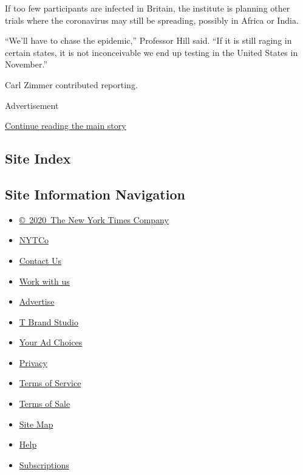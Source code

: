 If too few participants are infected in Britain, the institute is
planning other trials where the coronavirus may still be spreading,
possibly in Africa or India.

``We'll have to chase the epidemic,'' Professor Hill said. ``If it is
still raging in certain states, it is not inconceivable we end up
testing in the United States in November.''

Carl Zimmer contributed reporting.

Advertisement

\protect\hyperlink{after-bottom}{Continue reading the main story}

\hypertarget{site-index}{%
\subsection{Site Index}\label{site-index}}

\hypertarget{site-information-navigation}{%
\subsection{Site Information
Navigation}\label{site-information-navigation}}

\begin{itemize}
\tightlist
\item
  \href{https://help.nytimes.com/hc/en-us/articles/115014792127-Copyright-notice}{©~2020~The
  New York Times Company}
\end{itemize}

\begin{itemize}
\tightlist
\item
  \href{https://www.nytco.com/}{NYTCo}
\item
  \href{https://help.nytimes.com/hc/en-us/articles/115015385887-Contact-Us}{Contact
  Us}
\item
  \href{https://www.nytco.com/careers/}{Work with us}
\item
  \href{https://nytmediakit.com/}{Advertise}
\item
  \href{http://www.tbrandstudio.com/}{T Brand Studio}
\item
  \href{https://www.nytimes.com/privacy/cookie-policy\#how-do-i-manage-trackers}{Your
  Ad Choices}
\item
  \href{https://www.nytimes.com/privacy}{Privacy}
\item
  \href{https://help.nytimes.com/hc/en-us/articles/115014893428-Terms-of-service}{Terms
  of Service}
\item
  \href{https://help.nytimes.com/hc/en-us/articles/115014893968-Terms-of-sale}{Terms
  of Sale}
\item
  \href{https://spiderbites.nytimes.com}{Site Map}
\item
  \href{https://help.nytimes.com/hc/en-us}{Help}
\item
  \href{https://www.nytimes.com/subscription?campaignId=37WXW}{Subscriptions}
\end{itemize}
